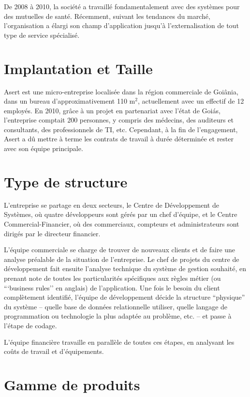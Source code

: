 De 2008 à 2010, la société a travaillé fondamentalement avec des systèmes pour des mutuelles de santé. Récemment, suivant les tendances du marché, l'organisation a élargi son champ d'application jusqu'à l'externalisation de tout type de service spécialisé.

\section{Implantation et Taille}

Asert est une micro-entreprise localisée dans la région commerciale de Goiânia, dans un bureau d'approximativement 110 m$^2$, actuellement avec un effectif de 12 employés. En 2010, grâce à un projet en partenariat avec l'état de Goiás, l'entreprise comptait 200 personnes, y compris des médecins, des auditeurs et consultants, des professionnels de TI, etc. Cependant, à la fin de l'engagement, Asert a dû mettre à terme les contrats de travail à durée déterminée et rester avec son équipe principale.

\section{Type de structure}

L'entreprise se partage en deux secteurs, le Centre de Développement de Systèmes, où quatre développeurs sont gérés par un chef d'équipe, et le Centre Commercial-Financier, où des commerciaux, compteurs et administrateurs sont dirigés par le directeur financier.

L'équipe commerciale se charge de trouver de nouveaux clients et de faire une analyse préalable de la situation de l'entreprise. Le chef de projets du centre de développement fait ensuite l'analyse technique du système de gestion souhaité, en prenant note de toutes les particularités spécifiques aux règles métier (ou ```business rules'' en anglais) \cite{regle-metier} de l'application. Une fois le besoin du client complètement identifié, l'équipe de développement décide la structure ``physique'' du système -- quelle base de données relationnelle utiliser, quelle langage de programmation ou technologie la plus adaptée au problème, etc. -- et passe à l'étape de codage.

L'équipe financière travaille en parallèle de toutes ces étapes, en analysant les coûts de travail et d'équipements.

\section{Gamme de produits}

